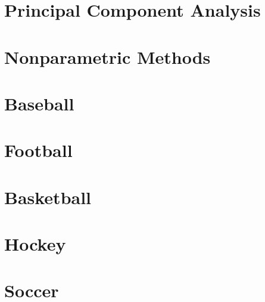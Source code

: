 \documentclass[
  11pt,
]{book}
\theoremstyle{definition}
\theoremstyle{definition}
\theoremstyle{definition}
\theoremstyle{definition}
\theoremstyle{remark}
\begin{document}
\hypertarget{principal-component-analysis}{%
\chapter{Principal Component Analysis}\label{principal-component-analysis}}

\hypertarget{nonparametric-methods}{%
\chapter{Nonparametric Methods}\label{nonparametric-methods}}

\hypertarget{baseball-1}{%
\chapter{Baseball}\label{baseball-1}}

\hypertarget{football-1}{%
\chapter{Football}\label{football-1}}

\hypertarget{basketball-1}{%
\chapter{Basketball}\label{basketball-1}}

\hypertarget{hockey-1}{%
\chapter{Hockey}\label{hockey-1}}

\hypertarget{soccer-1}{%
\chapter{Soccer}\label{soccer-1}}

  
\end{document}
